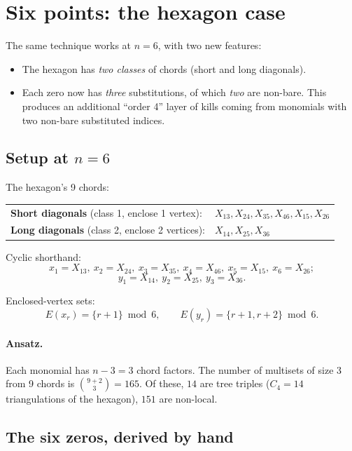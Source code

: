 \documentclass[11pt]{article}
\newcommand{\X}[2]{X_{#1#2}}
\theoremstyle{definition}
\begin{document}
\section{Six points: the hexagon case}
\label{sec:n6}

The same technique works at $n=6$, with two new features:
\begin{itemize}[nosep,leftmargin=2em]
\item The hexagon has \emph{two classes} of chords (short and long diagonals).
\item Each zero now has \emph{three} substitutions, of which \emph{two} are
non-bare. This produces an additional ``order 4'' layer of kills coming
from monomials with two non-bare substituted indices.
\end{itemize}

\subsection{Setup at $n=6$}

The hexagon's 9 chords:
\begin{center}
\begin{tabular}{ll}
\textbf{Short diagonals} (class 1, enclose 1 vertex): &
$\X{1}{3},\X{2}{4},\X{3}{5},\X{4}{6},\X{1}{5},\X{2}{6}$ \\
\textbf{Long diagonals} (class 2, enclose 2 vertices): &
$\X{1}{4},\X{2}{5},\X{3}{6}$
\end{tabular}
\end{center}

Cyclic shorthand:
\[
x_1=\X{1}{3},\ x_2=\X{2}{4},\ x_3=\X{3}{5},\ x_4=\X{4}{6},\ x_5=\X{1}{5},\ x_6=\X{2}{6};
\]
\[
y_1=\X{1}{4},\ y_2=\X{2}{5},\ y_3=\X{3}{6}.
\]

Enclosed-vertex sets:
\[
E(x_r) = \{r+1\}\bmod 6,\qquad E(y_r) = \{r+1, r+2\}\bmod 6.
\]

\paragraph{Ansatz.} Each monomial has $n-3=3$ chord factors. The number of
multisets of size 3 from 9 chords is $\binom{9+2}{3}=165$. Of these, $14$
are tree triples ($C_4=14$ triangulations of the hexagon), $151$ are
non-local.

\subsection{The six zeros, derived by hand}
\end{document}
